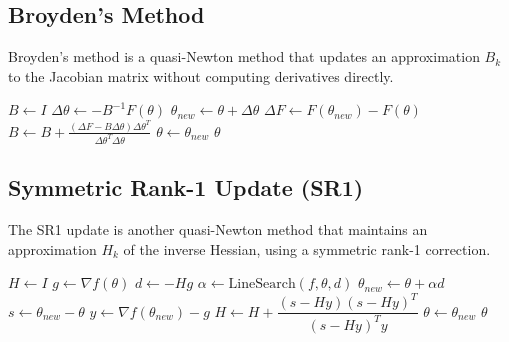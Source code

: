 \subsection{Broyden's Method}

  \begin{algo}
    Broyden's method is a quasi-Newton method that updates an approximation $B_k$ to the Jacobian matrix without computing derivatives directly. 
    \begin{algorithm}[H]
    \label{alg:broyden}
    \begin{algorithmic}[1]

        \State $B \gets I$ 
          \State $\Delta \theta \gets -B^{-1} F(\theta)$
          \State $\theta_{new} \gets \theta + \Delta \theta$
          \State $\Delta F \gets F(\theta_{new}) - F(\theta)$
          \State $B \gets B + \frac{(\Delta F - B \Delta \theta)\Delta \theta^T}{\Delta \theta^T \Delta \theta}$
          \State $\theta \gets \theta_{new}$
        \EndWhile
        \State \Return $\theta$
      \EndProcedure
    \end{algorithmic}
    \end{algorithm}
  \end{algo}

\subsection{Symmetric Rank-1 Update (SR1)}

  \begin{algo}
    The SR1 update is another quasi-Newton method that maintains an approximation $H_k$ of the inverse Hessian, using a symmetric rank-1 correction. 
    \begin{algorithm}[H]
    \label{alg:sr1}
    \begin{algorithmic}[1]

        \State $H \gets I$
          \State $g \gets \nabla f(\theta)$
          \State $d \gets -H g$
          \State $\alpha \gets \text{LineSearch}(f, \theta, d)$
          \State $\theta_{new} \gets \theta + \alpha d$
          \State $s \gets \theta_{new} - \theta$
          \State $y \gets \nabla f(\theta_{new}) - g$
            \State $H \gets H + \dfrac{(s - Hy)(s - Hy)^T}{(s - Hy)^T y}$
          \EndIf
          \State $\theta \gets \theta_{new}$
        \EndWhile
        \State \Return $\theta$
      \EndProcedure
    \end{algorithmic}
    \end{algorithm}
  \end{algo}


